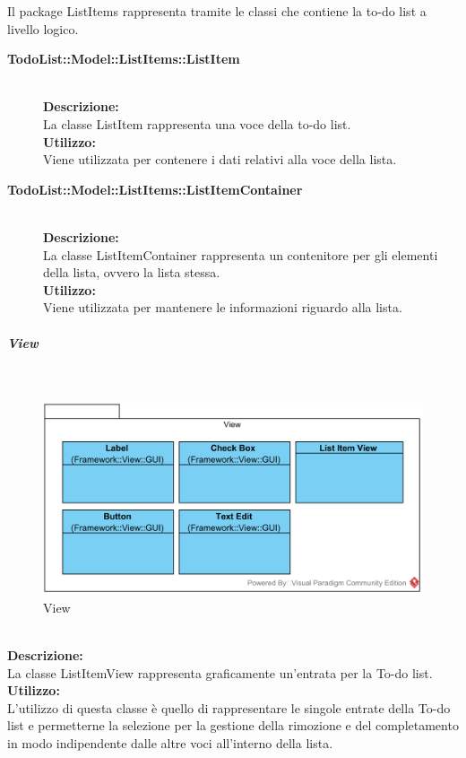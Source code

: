 Il package ListItems rappresenta tramite le classi che contiene la to-do list a livello logico.\\
\begin{description}
	\item[\textbf{TodoList\-::Model\-::ListItems::ListItem}] \hfill\\
	\textbf{Descrizione:}\\
	La classe ListItem rappresenta una voce della to-do list.\\
	\textbf{Utilizzo:}\\
	Viene utilizzata per contenere i dati relativi alla voce della lista.
	\item[\textbf{TodoList\-::Model\-::ListItems::ListItemContainer}] \hfill\\
	\textbf{Descrizione:}\\
	La classe ListItemContainer rappresenta un contenitore per gli elementi della lista, ovvero la lista stessa.\\
	\textbf{Utilizzo:}\\
	Viene utilizzata per mantenere le informazioni riguardo alla lista.
\end{description}


\subparagraph{View}\mbox{}\\
\nopagebreak
\begin{figure}[H]
	\centering
	\includegraphics[width=14cm]{../../documenti/SpecificaTecnica/diagrammi_img/classi_e_package/todo_view.png}
	\caption{View}
\end{figure}

\label{todo-item}\mbox{}\\
\textbf{Descrizione:}\\
La classe ListItemView rappresenta graficamente un'entrata per la To-do list.\\
\textbf{Utilizzo:}\\
L'utilizzo di questa classe è quello di rappresentare le singole entrate della To-do list e permetterne la selezione per la gestione della rimozione e del completamento in modo indipendente dalle altre voci all'interno della lista.\\


